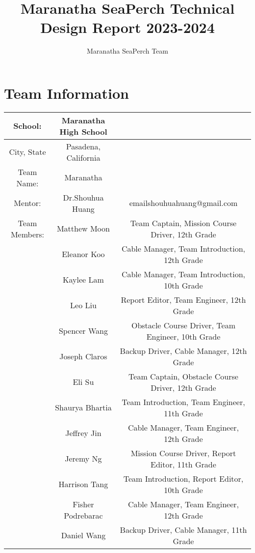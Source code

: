 \documentclass[11pt, oneside]{article}   	%
\title{Maranatha SeaPerch Technical Design Report 2023-2024}
\author{Maranatha SeaPerch Team}
\begin{document}
\maketitle

\pagebreak

\section*{Team Information}
\begin{center}
	\begin{tabular}{|c|c|c|}
		\hline
		School: & Maranatha High School & \\
		\hline
		City, State & Pasadena, California & \\
		\hline
		Team Name: & Maranatha & \\
		\hline
		Mentor: & Dr.Shouhua Huang & emailshouhuahuang@gmail.com \\
		\hline
		\hline
		Team Members: & Matthew Moon & Team Captain, Mission Course Driver, 12th Grade \\
		\hline
		& Eleanor Koo & Cable Manager, Team Introduction, 12th Grade\\
		\hline
		& Kaylee Lam & Cable Manager, Team Introduction, 10th Grade\\
		\hline
		& Leo Liu & Report Editor, Team Engineer, 12th Grade\\
		\hline
		& Spencer Wang & Obstacle Course Driver, Team Engineer, 10th Grade\\
		\hline
		& Joseph Claros & Backup Driver, Cable Manager, 12th Grade\\
		\hline
		\hline
		& Eli Su & Team Captain, Obstacle Course Driver, 12th Grade\\
		\hline
		& Shaurya Bhartia & Team Introduction, Team Engineer, 11th Grade\\
		\hline
		& Jeffrey Jin & Cable Manager, Team Engineer, 12th Grade\\
		\hline
		& Jeremy Ng & Mission Course Driver, Report Editor, 11th Grade\\
		\hline
		& Harrison Tang & Team Introduction, Report Editor, 10th Grade\\
		\hline
		& Fisher Podrebarac & Cable Manager, Team Engineer, 12th Grade\\
		\hline
		& Daniel Wang & Backup Driver, Cable Manager, 11th Grade\\
		\hline
	\end{tabular}
\end{center}
\end{document}

